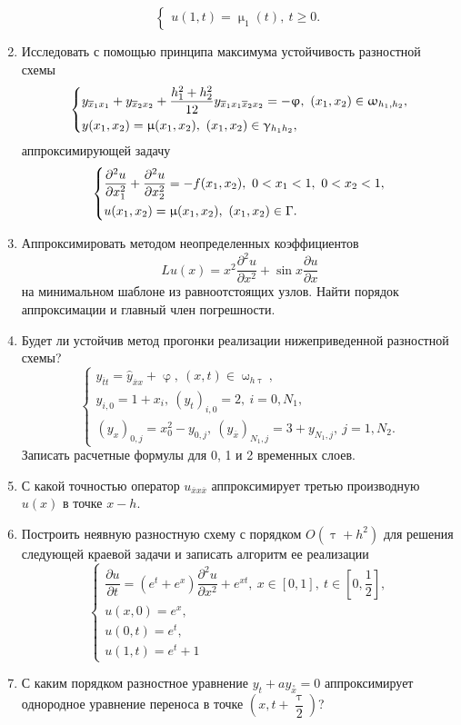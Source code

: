 \documentclass[a4paper, 12pt]{report}
\numberwithin{equation}{section}
\newcommand{\ol}{\overline}
\renewcommand{\geq}{\geqslant}
\renewcommand{\gamma}{\upgamma}
\renewcommand{\varphi}{\upvarphi}
\renewcommand{\tau}{\uptau}
\renewcommand{\mu}{\upmu}
\renewcommand{\omega}{\upomega}
\renewcommand{\d}{\partial}
\begin{document}
\begin{enumerate}
$$\begin{cases}
			u(1,t) = \mu_1(t),\ t \geq 0.
		\end{cases}$$
		\item Исследовать с помощью принципа максимума устойчивость разностной схемы
		$$\begin{dcases}
			y_{\ol x_1 x_1} + y_{\ol x_2 x_2} + \dfrac{h_1^2 + h_2^2}{12}y_{\ol x _1 x_1 \ol x_2 x_2} = - \varphi,\ (x_1,x_2)\in \omega_{h_1,h_2},\\
			y(x_1,x_2) = \mu(x_1, x_2),\ (x_1,x_2)\in \gamma _{h_1 h_2},
		\end{dcases}$$
		аппроксимирующей задачу
		$$\begin{dcases}
			\dfrac{\d^2 u}{\d x_1^2} + \dfrac{\d ^2 u}{\d x_2 ^2} = - f(x_1,x_2),\ 0<x_1<1,\ 0<x_2<1,\\
			u(x_1, x_2) = \mu(x_1, x_2),\ (x_1,x_2) \in \Gamma.
		\end{dcases}$$
		\item Аппроксимировать методом неопределенных коэффициентов $$Lu(x) = x^2 \dfrac{\d^2 u}{\d x^2} + \sin x \dfrac{\d u}{\d x}$$ на минимальном шаблоне из равноотстоящих узлов. Найти порядок аппроксимации и главный член погрешности.
		\item Будет ли устойчив метод прогонки реализации нижеприведенной разностной схемы?
		$$\begin{cases}
			y_{\ol t t} = \hat y_{\ol x x} + \varphi,\ (x,t) \in \omega_{h\tau},\\
			y_{i,0} = 1 + x_i,\ (y_t)_{i,0} = 2,\ i = 0, N_1,\\
			(y_x)_{0,j} = x_0^2 - y_{0,j},\ (y_{\ol x})_{N_1, j} = 3 + y_{N_1, j},\ j = 1, N_2.
		\end{cases}$$
		Записать расчетные формулы для 0, 1 и 2 временных слоев.
		\item С какой точностью оператор $u_{\ol x x \ol x}$ аппроксимирует третью производную $u(x)$ в точке $x-h$.
		\item Построить неявную разностную схему с порядком $O(\tau + h^2)$ для решения следующей краевой задачи и записать алгоритм ее реализации
		$$\begin{cases}
			\dfrac{\d u}{\d t} = (e^t + e^x) \dfrac{\d ^2 u}{\d x^2} + e^{xt},\ x \in [0,1],\ t \in \left[0, \dfrac 12\right],\\
			u(x,0) = e^x,\\
			u(0,t) = e^t,\\
			u(1,t) = e^t + 1
		\end{cases}$$
		\item С каким порядком разностное уравнение $y_t+a y_{\overset{\circ}x}=0$ аппроксимирует однородное уравнение переноса в точке $\left(x, t+ \dfrac \tau 2\right)$?

\end{enumerate}
\end{document}
